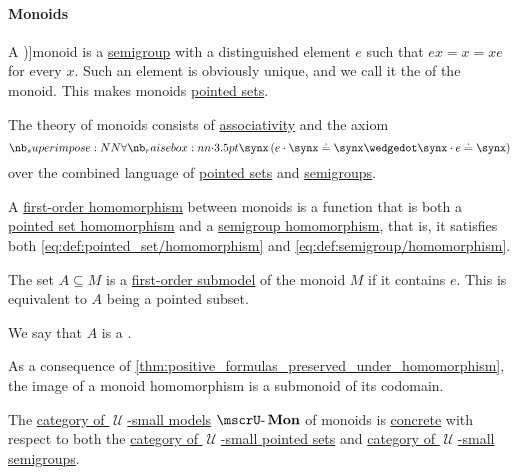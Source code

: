 \paragraph{Monoids}

\begin{definition}\label{def:monoid}
  A \term[ru=моноид (\cite[94]{Мальцев1970АлгебраическиеСистемы})]{monoid} is a \hyperref[def:semigroup]{semigroup} with a distinguished element \( e \) such that \( ex = x = xe \) for every \( x \). Such an element is obviously unique, and we call it the  of the monoid. This makes monoids \hyperref[def:pointed_set]{pointed sets}.

  \begin{thmenum}
    \mimprovised The theory of monoids consists of \hyperref[eq:def:binary_operation/associative]{associativity} and the axiom
    \begin{equation}\label{eq:def:monoid/theory/neutral}
      \qforall \synx (e \cdot \synx \syneq \synx \synwedge \synx \cdot e \syneq \synx)
    \end{equation}
    over the combined language of \hyperref[def:pointed_set/theory]{pointed sets} and \hyperref[def:semigroup/theory]{semigroups}.

     A \hyperref[def:first_order_homomorphism]{first-order homomorphism} between monoids is a function that is both a \hyperref[def:pointed_set/homomorphism]{pointed set homomorphism} and a \hyperref[def:semigroup/homomorphism]{semigroup homomorphism}, that is, it satisfies both \eqref{eq:def:pointed_set/homomorphism} and \eqref{eq:def:semigroup/homomorphism}.

     The set \( A \subseteq M \) is a \hyperref[def:first_order_submodel]{first-order submodel} of the monoid \( M \) if it contains \( e \). This is equivalent to \( A \) being a pointed subset.

    We say that \( A \) is a .

    As a consequence of \cref{thm:positive_formulas_preserved_under_homomorphism}, the image of a monoid homomorphism is a submonoid of its codomain.

     The \hyperref[def:category_of_small_first_order_models]{category of \( \mscrU \)-small models} \( \ucat{Mon} \) of monoids is \hyperref[def:concrete_category]{concrete} with respect to both the \hyperref[def:pointed_set/category]{category of \( \mscrU \)-small pointed sets} and \hyperref[def:semigroup/category]{category of \( \mscrU \)-small semigroups}.


\end{thmenum}
\end{definition}
